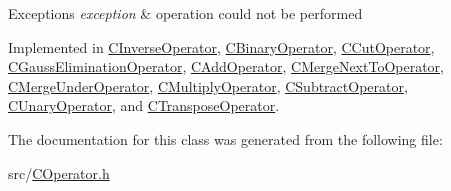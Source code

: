 \begin{DoxyExceptions}{Exceptions}
{\em exception} & operation could not be performed \\
\hline
\end{DoxyExceptions}


Implemented in \hyperlink{classCInverseOperator_a65bd9fa67c49aec828506cb7188fd8f5}{C\+Inverse\+Operator}, \hyperlink{classCBinaryOperator_aea1eef33f83a4e395091daa0637f4c77}{C\+Binary\+Operator}, \hyperlink{classCCutOperator_ad401b31051d8b245cc0258d773f4f816}{C\+Cut\+Operator}, \hyperlink{classCGaussEliminationOperator_a65b706ae08cef92db1e5aed380e1a7ee}{C\+Gauss\+Elimination\+Operator}, \hyperlink{classCAddOperator_a231aacd1eab97d55bb41bc05139420df}{C\+Add\+Operator}, \hyperlink{classCMergeNextToOperator_af0089f8a8e0de3f9f25e7829d6a5a6fa}{C\+Merge\+Next\+To\+Operator}, \hyperlink{classCMergeUnderOperator_ae1015649a31bd8a92dfef34ed3fec44c}{C\+Merge\+Under\+Operator}, \hyperlink{classCMultiplyOperator_a5acd8e1569398963bb2d80846ec1656e}{C\+Multiply\+Operator}, \hyperlink{classCSubtractOperator_a0caad8afe8a56c60e14f2276e7ec1f2d}{C\+Subtract\+Operator}, \hyperlink{classCUnaryOperator_a17b01d9de023a58642f6fd82f214cde0}{C\+Unary\+Operator}, and \hyperlink{classCTransposeOperator_a1010970978708b06a659237afb88c043}{C\+Transpose\+Operator}.



The documentation for this class was generated from the following file\+:\begin{DoxyCompactItemize}
\item 
src/\hyperlink{COperator_8h}{C\+Operator.\+h}\end{DoxyCompactItemize}
